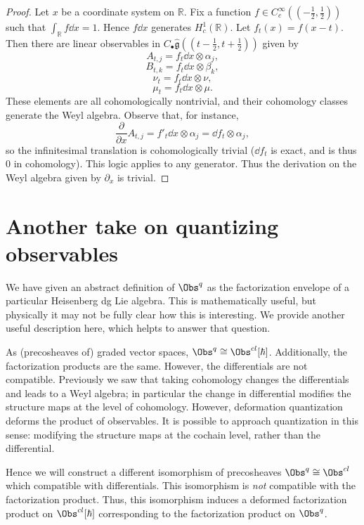 \begin{proof}
	Let $x$ be a coordinate system on $\mathbb{R} $. Fix a function $f\in C^\infty _c((-\frac{1}{2} ,\frac{1}{2} ))$ such that $\int_{\mathbb{R} } f\dd x=1$. Hence $f\dd x$ generates $H^1_c(\mathbb{R} )$. Let $f_t(x) = f(x-t)$. Then there are linear observables in $C_{\bullet} \widehat{\mathfrak{g} } ((t-\frac{1}{2} ,t+\frac{1}{2} ))$ given by
	\[
		A_{t,j} = f_t\dd x\otimes \alpha _j,
	\]
	\[
		B_{t,k} =f_t\dd x \otimes \beta _k,
	\]
	\[
		\nu _t = f_t\dd x\otimes \nu ,
	\]
	\[
		\mu _t = f_t\dd x\otimes \mu 
	.\]
	These elements are all cohomologically nontrivial, and their cohomology classes generate the Weyl algebra. Observe that, for instance,
	\[
		\frac{\partial }{\partial x} A_{t,j} =f'_t\dd x \otimes \alpha _j = \dd f_t \otimes \alpha _j,
	\]
	so the infinitesimal translation is cohomologically trivial ($\dd f_t$ is exact, and is thus 0 in cohomology). This logic applies to any generator. Thus the derivation on the Weyl algebra given by $\partial _x$ is trivial.
\end{proof}

\section{Another take on quantizing observables}

We have given an abstract definition of $\Obs^{q} $ as the factorization envelope of a particular Heisenberg dg Lie algebra. This is mathematically useful, but physically it may not be fully clear how this is interesting. We provide another useful description here, which helpts to answer that question.

As (precosheaves of) graded vector spaces, $\Obs^{q} \cong \Obs^{cl} [\hbar ]$. Additionally, the factorization products are the same. However, the differentials are not compatible. Previously we saw that taking cohomology changes the differentials and leads to a Weyl algebra; in particular the change in differential modifies the structure maps at the level of cohomology. However, deformation quantization deforms the product of observables. It is possible to approach quantization in this sense: modifying the structure maps at the cochain level, rather than the differential.

Hence we will construct a different isomorphism of precosheaves $\Obs^{q} \cong \Obs^{cl} $ which compatible with differentials. This isomorphism is \emph{not} compatible with the factorization product. Thus, this isomorphism induces a deformed factorization product on $\Obs^{cl} [\hbar ]$ corresponding to the factorization product on $\Obs^{q} $.

